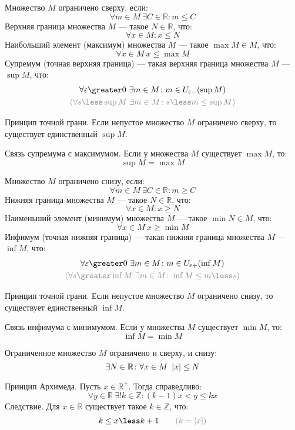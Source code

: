 Множество $M$ {\bold ограничено сверху}, если:
$$\forall m\in M\ \exists C\in\mathbb{R}\colon m\leq C$$
{\bold Верхняя граница} множества $M$ --- такое $N\in\mathbb{R}$, что:
$$\forall x\in M\colon x\leq N$$
{\bold Наибольший элемент} {\ital (максимум)} множества $M$ --- такое $\max M\in M$, что:
$$\forall x\in M\ x\leq\max M$$
{\bold Супремум} {\ital (точная верхняя граница)} --- такая верхняя граница множества $M$ --- $\sup M$, что:
$$\begin{gathered}
\forall\varepsilon\greater 0\ \exists m\in M\colon m\in U_{\varepsilon-}(\sup M)\\
{\color{desc}(\forall s\less\sup M\ \exists m\in M\colon s\less m\leq\sup M)}
\end{gathered}$$
\begin{theorem}
{\bold Принцип точной грани.} Если непустое множество $M$ ограничено сверху, то существует {\ital единственный} $\sup M$.
\end{theorem}
\begin{theorem}
{\bold Связь супремума с максимумом.} Если у множества $M$ существует $\max M$, то:
$$\sup M=\max M$$ 
\end{theorem}
Множество $M$ {\bold ограничено снизу}, если:
$$\forall m\in M\ \exists C\in\mathbb{R}\colon m\geq C$$
{\bold Нижняя граница} множества $M$ --- такое $N\in\mathbb{R}$, что:
$$\forall x\in M\colon x\geq N$$
{\bold Наименьший элемент} {\ital (минимум)} множества $M$ --- такое $\min N\in M$, что:
$$\forall x\in M\ x\geq\min M$$
{\bold Инфимум} {\ital (точная нижняя граница)} --- такая нижняя граница множества $M$ --- $\inf M$, что:
$$\begin{gathered}
\forall\varepsilon\greater 0\ \exists m\in M\colon m\in U_{\varepsilon+}(\inf M)\\
{\color{desc}(\forall s\greater\inf M\ \exists m\in M\colon \inf M\leq m\less s)}
\end{gathered}$$
\begin{theorem}
{\bold Принцип точной грани.} Если непустое множество $M$ ограничено снизу, то существует {\ital единственный} $\inf M$.
\end{theorem}
\begin{theorem}
{\bold Связь инфимума с минимумом.} Если у множества $M$ существует $\min M$, то:
$$\inf M=\min M$$ 
\end{theorem}
{\bold Ограниченное} множество $M$ ограничено {\ital и сверху, и снизу}:
$$\exists N\in\mathbb{R}\colon\forall x\in M\ \abs{x}\leq N$$
\begin{theorem}
{\bold Принцип Архимеда.} Пусть $x\in\mathbb{R}^+$. Тогда справедливо:
$$\forall y\in\mathbb{R}\ \exists!k\in\mathbb{Z}\colon (k-1)x\less y\leq kx$$
{\bold Следствие.} Для $x\in\mathbb{R}$ существует такое $k\in\mathbb{Z}$, что:
$$k\leq x\less k+1\qquad{\color{desc} (k=[x])}$$
\end{theorem}
